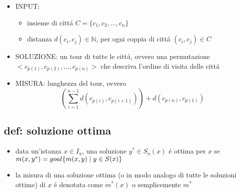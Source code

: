 \begin{flushleft}
\begin{itemize}
		\begin{itemize}
			\item INPUT:
			\begin{itemize}
				\item insieme di citt\'a $C=\{c_1,c_2,\ldots,c_n\}$
				\item distanza $d(c_i,c_j)\in\mathbb{N}$, per ogni coppia di citt\'a $(c_i,c_j)\in C$
			\end{itemize}
		\item SOLUZIONE: un tour di tutte le citt\'a, ovvero una permutazione $<c_{p(1)},c_{p(2)},\ldots,c_{p(n)}>$ che descriva l'ordine di visita delle citt\'a
			\item MISURA: lunghezza del tour, ovvero
				$$(\sum_{i=1}^{n-1}d(c_{p(i)},c_{p(i+1)}))+d(c_{p(n)},c_{p(1)})$$
		\end{itemize}
	\end{itemize}
\end{flushleft}


\subsection*{def: soluzione ottima}
\begin{flushleft}
	\begin{itemize}
		\item data un'istanza $x\in I_\pi$, una soluzione $y^*\in S_\pi(x)$ \'e ottima per $x$ se $m(x,y^*)=goal\{m(x,y)\hspace{0.1cm}\vert\hspace{0.1cm}y\in S(x)\}$
	\item la misura di una soluzione ottima (o in modo analogo di tutte le soluzioni ottime) di $x$ \'e denotata come $m^*(x)$ o semplicemente $m^*$
	\end{itemize}
\end{flushleft}


